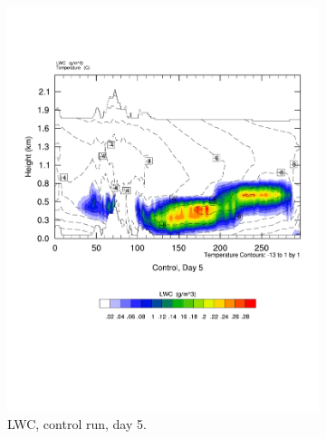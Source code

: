 \begin{figure}[ht]
    \begin{subfigure}{0.48\textwidth}
        \centering
        \includegraphics[width=\textwidth]{results/control/crossSec_LWC_Control_Day5.pdf}
        \caption{LWC, control run, day 5.}
        \label{subfig:cross_LWC_Day5}
    \end{subfigure}
    \begin{subfigure}{0.48\textwidth}
        \centering

\end{subfigure}
\end{figure}
